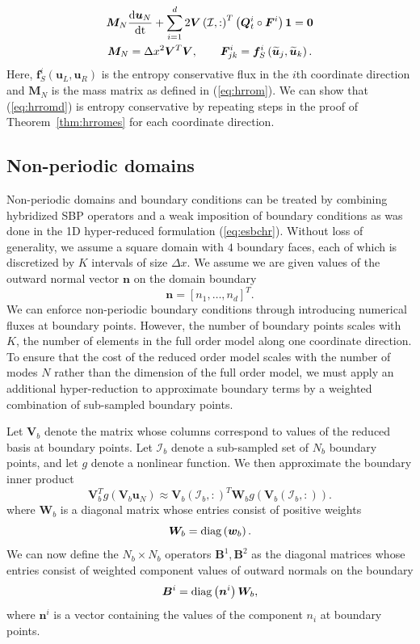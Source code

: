 \documentclass[review]{siamart171218}
\theoremstyle{assumption}
\renewcommand{\tilde}{\widetilde}
\newcommand{\td}[2]{\frac{{\rm d}#1}{{\rm d}{\rm #2}}}
\newcommand{\LRp}[1]{\left( #1 \right)}
\newcommand{\LRs}[1]{\left[ #1 \right]}
\begin{document}
\begin{gather}
\bm{M}_N\td{\bm{u}_N}{t} + \sum_{i=1}^d 2\bm{V}\LRp{\mathcal{I},:}^T\LRp{\bm{Q}^i_t \circ \bm{F}^i}\bm{1} = \bm{0} \label{eq:hrromd}\\
\bm{M}_N = \Delta x^2 \bm{V}^T\bm{V}, \qquad \bm{F}^i_{jk} = \bm{f}^i_S\LRp{\tilde{\bm{u}}_j,\tilde{\bm{u}}_k}.\nonumber
\end{gather}
Here, $\bm{f}^i_S\LRp{\bm{u}_L,\bm{u}_R}$ is the entropy conservative flux in the $i$th coordinate direction and $\bm{M}_N$ is the mass matrix as defined in (\ref{eq:hrrom}).  We can show that (\ref{eq:hrromd}) is entropy conservative by repeating steps in the proof of Theorem~\ref{thm:hrromes} for each coordinate direction.  

\subsection{Non-periodic domains}

Non-periodic domains and boundary conditions can be treated by combining hybridized SBP operators and a weak imposition of boundary conditions as was done in the 1D hyper-reduced formulation (\ref{eq:esbchr}).  Without loss of generality, we assume a square domain with $4$ boundary faces, each of which is discretized by $K$ intervals of size $\Delta x$.  We assume we are given values of the outward normal vector $\bm{n}$ on the domain boundary
\[
\bm{n} = \LRs{n_1, \ldots, n_d}^T.
\]
We can enforce non-periodic boundary conditions through introducing numerical fluxes at boundary points.  However, the number of boundary points scales with $K$, the number of elements in the full order model along one coordinate direction.  To ensure that the cost of the reduced order model scales with the number of modes $N$ rather than the dimension of the full order model, we must apply an additional hyper-reduction to approximate boundary terms by a weighted combination of sub-sampled boundary points.  

Let $\bm{V}_b$ denote the matrix whose columns correspond to values of the reduced basis at boundary points.  Let $\mathcal{I}_b$ denote a sub-sampled set of $N_b$ boundary points, and let $g$ denote a nonlinear function.  We then approximate the boundary inner product 
\[
\bm{V}_b^Tg(\bm{V}_b\bm{u}_N) \approx \bm{V}_b\LRp{\mathcal{I}_b,:}^T \bm{W}_b g\LRp{\bm{V}_b\LRp{\mathcal{I}_b,:}}.
\]
where $\bm{W}_b$ is a diagonal matrix whose entries consist of positive weights
\[
\bm{W}_b = {\rm diag}\LRp{\bm{w}_b}.
\]
We can now define the $N_b\times N_b$ operators $\bm{B}^1, \bm{B}^2$ as the diagonal matrices whose entries consist of weighted component values of outward normals on the boundary 
\[
\bm{B}^i = {\rm diag}\LRp{\bm{n}^i} \bm{W}_b,
\]
where $\bm{n}^i$ is a vector containing the values of the component $n_i$ at boundary points.  
\end{document}
